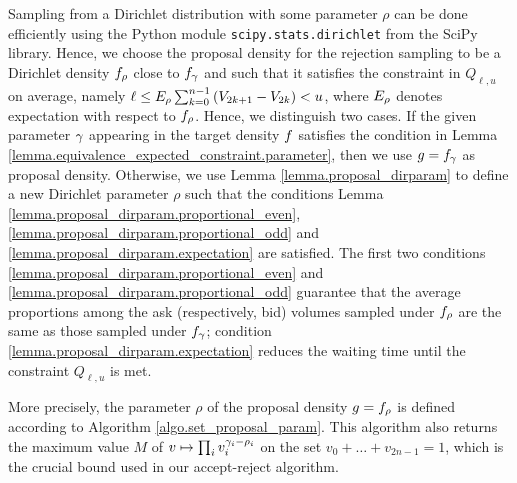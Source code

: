\documentclass[10pt]{article}
\begin{document}
Sampling from a Dirichlet distribution with some parameter $\rho$ can be done efficiently using the Python module \texttt{scipy.stats.dirichlet} from the SciPy library. Hence, we choose the proposal density for the rejection sampling to be a Dirichlet density $\dirichletDensity[\rho]$ close to $\dirichletDensity$ and such that it satisfies the constraint in $Q_{\ell,u}$ on average, namely   $\ell \leq \Expectation_{\rho} \sum_{k=0}^{n-1} \left( V_{2k+1} - V_{2k} \right) < u $, where $\Expectation_{\rho}$ denotes expectation with respect to $\dirichletDensity[\rho]$. Hence, we distinguish two cases. If the given parameter $\dirparam$ appearing in the target density $\targetDensity$ satisfies the condition in Lemma \ref{lemma.equivalence_expected_constraint.parameter}, then we use $\proposalDensity = \dirichletDensity$ as proposal density. Otherwise, we use Lemma \ref{lemma.proposal_dirparam} to define a new Dirichlet parameter $\rho$ such that the conditions Lemma \ref{lemma.proposal_dirparam.proportional_even}, \ref{lemma.proposal_dirparam.proportional_odd} and \ref{lemma.proposal_dirparam.expectation} are satisfied. The first two conditions \ref{lemma.proposal_dirparam.proportional_even} and \ref{lemma.proposal_dirparam.proportional_odd} guarantee that the average proportions among the ask (respectively, bid) volumes sampled under $\dirichletDensity[\rho]$ are the same as those sampled under $\dirichletDensity$; condition \ref{lemma.proposal_dirparam.expectation} reduces the waiting time until the constraint $Q_{\ell,u}$ is met. 

More precisely, the parameter $\rho$ of the proposal density $\proposalDensity = \dirichletDensity[\rho]$ is defined according to Algorithm \ref{algo.set_proposal_param}. This algorithm also returns the maximum value $M$ of $v\mapsto \prod_{i} v_{i}^{\dirparam_i - \rho_i}$ on the set $v_0 +\dots +v_{2n-1} = 1$, which is the crucial bound used in our accept-reject algorithm.
\end{document}
